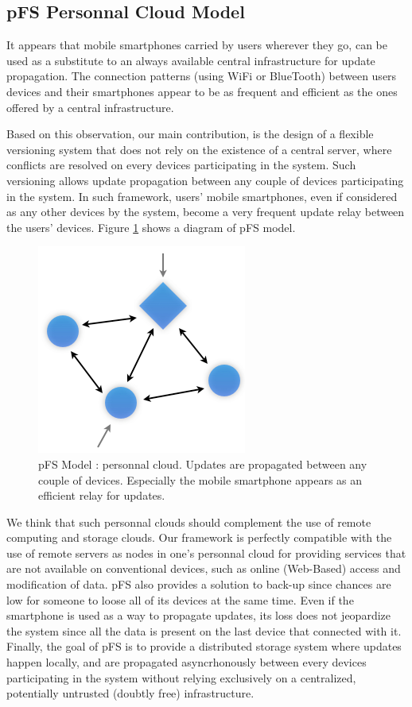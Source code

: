 \subsection {pFS Personnal Cloud Model}

It appears that mobile smartphones carried by users wherever they go,
can be used as a substitute to an always available central
infrastructure for update propagation. The connection patterns (using
WiFi or BlueTooth) between users devices and their smartphones appear
to be as frequent and efficient as the ones offered by a central
infrastructure.

Based on this observation, our main contribution, is the design of a
flexible versioning system that does not rely on the existence of a
central server, where conflicts are resolved on every devices
participating in the system. Such versioning allows update propagation
between any couple of devices participating in the system. In such
framework, users' mobile smartphones, even if considered as any other
devices by the system, become a very frequent update relay between the
users' devices. Figure \ref{PfsModel} shows a diagram of pFS model.

\begin{figure}[ht]
\begin{center}
  \includegraphics [scale=0.5] {img/pfs_model}
  \caption{\label{PfsModel} {\small pFS Model : personnal
      cloud. Updates are propagated between any couple of
      devices. Especially the mobile smartphone appears as an
      efficient relay for updates.}}
\end{center}
\end{figure}

We think that such personnal clouds should complement the use of
remote computing and storage clouds. Our framework is perfectly
compatible with the use of remote servers as nodes in one's personnal
cloud for providing services that are not available on conventional
devices, such as online (Web-Based) access and modification of
data. pFS also provides a solution to back-up since chances are low
for someone to loose all of its devices at the same time. Even if the
smartphone is used as a way to propagate updates, its loss does not
jeopardize the system since all the data is present on the last device
that connected with it. Finally, the goal of pFS is to provide a
distributed storage system where updates happen locally, and are
propagated asyncrhonously between every devices participating in the
system without relying exclusively on a centralized, potentially
untrusted (doubtly free) infrastructure.

